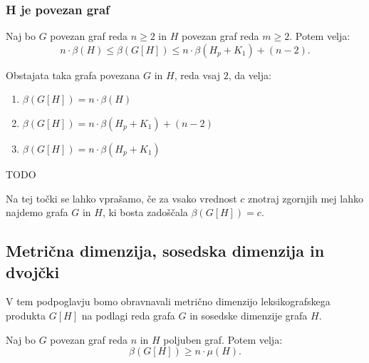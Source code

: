 \documentclass[mat1, tisk]{fmfdelo}
\newcommand{\1}{(1, 1, \ldots, 1)}
\newcommand{\2}{(2, 2, \ldots, 2)}
\begin{document}


\subsubsection{H je povezan graf} \label{sss:povzean}


\begin{izrek} \label{izrek:primeri_mdim_komp_povezan}
    Naj bo $G$ povezan graf reda $n \geq 2$ in $H$ povezan graf reda $m \geq 2$. Potem velja:
    $$
    n \cdot \beta(H)  
    \leq \beta(G[H]) \leq 
    n \cdot \beta(H_p + K_1) + (n-2). 
    $$
\end{izrek}

\begin{izrek} \label{izrek:omejitve_mdim_komp_povezan}
    Obstajata taka grafa povezana $G$ in $H$, reda vsaj $2$, da velja:
    \begin{enumerate}
        \item $\beta(G[H]) = n \cdot \beta(H)$
        \item $\beta(G[H]) = n \cdot \beta(H_p + K_1) + (n-2)$
        \item $\beta(G[H]) = n \cdot \beta(H_p + K_1)$
    \end{enumerate}
\end{izrek}
    
\begin{dokaz}
    TODO
\end{dokaz}

Na tej točki se lahko vprašamo, če za vsako vrednost $c$ znotraj zgornjih mej lahko najdemo
grafa $G$ in $H$, ki bosta zadoščala $\beta(G[H]) = c$.



\subsection{Metrična dimenzija, sosedska dimenzija in dvojčki}
V tem podpoglavju bomo obravnavali metrično dimenzijo leksikografskega produkta $G[H]$ na 
podlagi reda grafa $G$ in sosedske dimenzije grafa $H$. 

\begin{lema}
    Naj bo $G$ povezan graf reda $n$ in $H$ poljuben graf. Potem velja:
    $$\beta(G[H]) \geq n \cdot \mu(H).$$
\end{lema}
\end{document}
